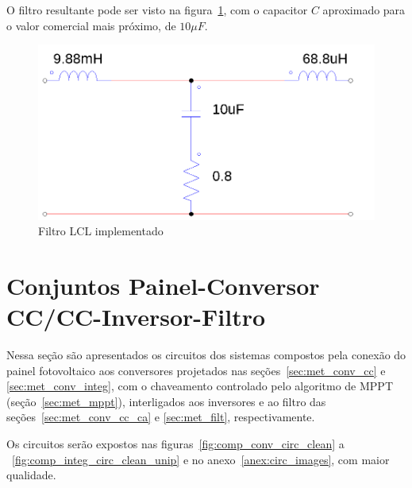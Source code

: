 \documentclass[
	12pt,				%
	openright,			%
	onseside,
	a4paper,			%
	english,			%
	french,				%
	spanish,			%
	brazil,				%
	]{abntex2}
\begin{document}
O filtro resultante pode ser visto na figura~\ref{fig:lcl_filter_impl}, com o capacitor $C$ aproximado para o valor comercial mais próximo, de $10 \mu F$.

\begin{figure}[htb]%
	\begin{center}%
		\includegraphics[width=0.55 \linewidth]{lcl_filter_psim}
		\caption{Filtro LCL implementado}
		\label{fig:lcl_filter_impl}
	\end{center}
\end{figure}

\section{Conjuntos Painel-Conversor CC/CC-Inversor-Filtro}

Nessa seção são apresentados os circuitos dos sistemas compostos pela conexão do painel fotovoltaico aos conversores projetados nas seções~\ref{sec:met_conv_cc} e \ref{sec:met_conv_integ}, com o chaveamento controlado pelo algoritmo de MPPT (seção~\ref{sec:met_mppt}), interligados aos inversores e ao filtro das seções~\ref{sec:met_conv_cc_ca} e \ref{sec:met_filt}, respectivamente.

Os circuitos serão expostos nas figuras~\ref{fig:comp_conv_circ_clean} a ~\ref{fig:comp_integ_circ_clean_unip} e no anexo~\ref{anex:circ_images}, com maior qualidade.
\end{document}
